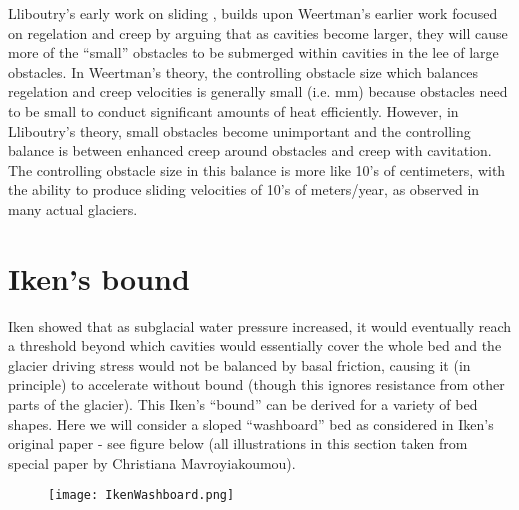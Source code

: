 \documentclass[12pt]{article}
\theoremstyle{definition}
\begin{document}
Lliboutry's early work on sliding \cite[]{lliboutry1968}, builds upon Weertman's earlier work focused on regelation and creep by arguing that as cavities become larger, they will cause more of the ``small'' obstacles to be submerged within cavities in the lee of large obstacles. In Weertman's theory, the controlling obstacle size which balances regelation and creep velocities is generally small (i.e. mm) because obstacles need to be small to conduct significant amounts of heat efficiently. However, in Lliboutry's theory, small obstacles become unimportant and the controlling balance is between enhanced creep around obstacles and creep with cavitation. The controlling obstacle size in this balance is more like 10's of centimeters, with the ability to produce sliding velocities of 10's of meters/year, as observed in many actual glaciers.

\section{Iken's bound}

Iken showed that as subglacial water pressure increased, it would eventually reach a threshold beyond which cavities would essentially cover the whole bed and the glacier driving stress would not be balanced by basal friction, causing it (in principle) to accelerate without bound (though this ignores resistance from other parts of the glacier). This Iken's ``bound'' can be derived for a variety of bed shapes. Here we will consider a sloped ``washboard'' bed as considered in Iken's original paper \cite[]{iken1981} - see figure below (all illustrations in this section taken from special paper by Christiana Mavroyiakoumou).
\begin{figure}
  \begin{center}
\texttt{[image: IkenWashboard.png]}
  \end{center}
\end{figure}
\end{document}
